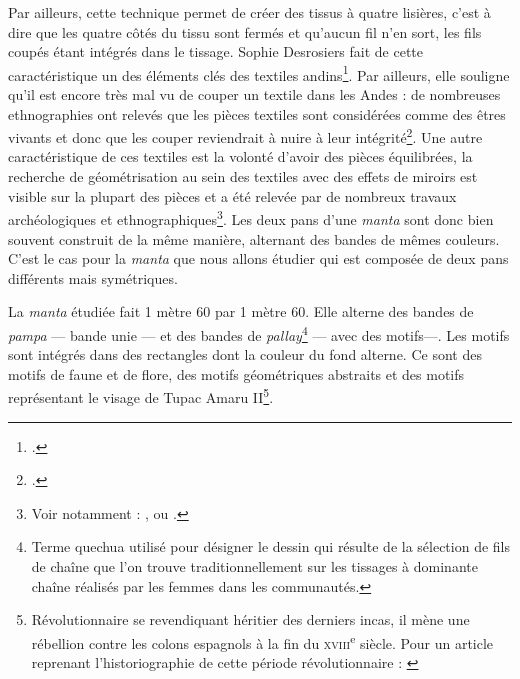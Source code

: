 \documentclass[a4paper, twoside, 12pt]{book}
\newcommand{\siecle}[1]{\textsc{#1}\textsuperscript{e} siècle}
\begin{document}
Par ailleurs, cette technique permet de créer des tissus à quatre lisières, c'est à dire que les quatre côtés du tissu sont fermés et qu'aucun fil n'en sort, les fils coupés étant intégrés dans le tissage. Sophie Desrosiers fait de cette caractéristique un des éléments clés des textiles andins\footcite[par.~8]{desrosiersLogicasTextilesLogicas1997}. Par ailleurs, elle souligne qu'il est encore très mal vu de couper un textile dans les Andes : de nombreuses ethnographies ont relevés que les pièces textiles sont considérées comme des êtres vivants et donc que les couper reviendrait à nuire à leur intégrité\footcite{cerecedaSemiologieTissusAndins1978}. Une autre caractéristique de ces textiles est la volonté d'avoir des pièces équilibrées, la recherche de géométrisation au sein des textiles avec des effets de miroirs est visible sur la plupart des pièces et a été relevée par de nombreux travaux archéologiques et ethnographiques\footnote{Voir notamment : \cite{onealeTextilePeriodsAncient1930}, \cite{cerecedaSemiologieTissusAndins1978} ou \cite{desrosiersLogicasTextilesLogicas1997}.}. Les deux pans d'une \textit{manta} sont donc bien souvent construit de la même manière, alternant des bandes de mêmes couleurs. C'est le cas pour la \textit{manta} que nous allons étudier qui est composée de deux pans différents mais symétriques.

La \textit{manta} étudiée fait 1 mètre 60 par 1 mètre 60. Elle alterne des bandes de \textit{pampa} --- bande unie --- et des bandes de \textit{pallay}\footnote{Terme quechua utilisé pour désigner le dessin qui résulte de la sélection de fils de chaîne que l'on trouve traditionnellement sur les tissages à dominante chaîne réalisés par les femmes dans les communautés.} --- avec des motifs---. Les motifs sont intégrés dans des rectangles dont la couleur du fond alterne. Ce sont des motifs de faune et de flore, des motifs géométriques abstraits et des motifs représentant le visage de Tupac Amaru II\footnote{Révolutionnaire se revendiquant héritier des derniers incas, il mène une rébellion contre les colons espagnols à la fin du \siecle{xviii}. Pour un article reprenant l'historiographie de cette période révolutionnaire : \cite{thomsonCuandoSoloReinasen2010}}.
\end{document}
